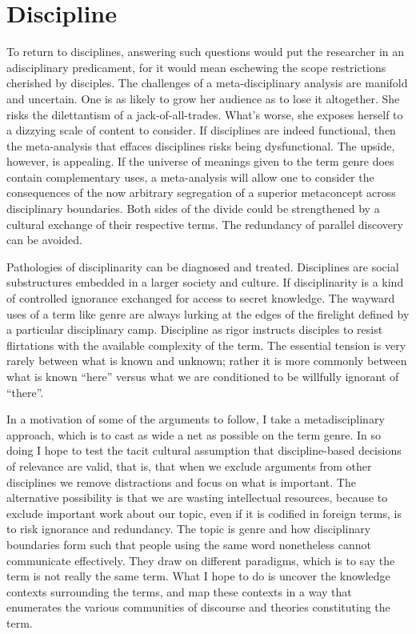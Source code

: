 \documentclass[]{book}
\theoremstyle{definition}
\theoremstyle{definition}
\theoremstyle{definition}
\theoremstyle{remark}
\begin{document}
\hypertarget{discipline}{%
\section{Discipline}\label{discipline}}

To return to disciplines, answering such questions would put the
researcher in an adisciplinary predicament, for it would mean eschewing
the scope restrictions cherished by disciples. The challenges of a
meta-disciplinary analysis are manifold and uncertain. One is as likely
to grow her audience as to lose it altogether. She risks the
dilettantism of a jack-of-all-trades. What's worse, she exposes herself
to a dizzying scale of content to consider. If disciplines are indeed
functional, then the meta-analysis that effaces disciplines risks being
dysfunctional. The upside, however, is appealing. If the universe of
meanings given to the term genre does contain complementary uses, a
meta-analysis will allow one to consider the consequences of the now
arbitrary segregation of a superior metaconcept across disciplinary
boundaries. Both sides of the divide could be strengthened by a cultural
exchange of their respective terms. The redundancy of parallel discovery
can be avoided.

Pathologies of disciplinarity can be diagnosed and treated. Disciplines
are social substructures embedded in a larger society and culture. If
disciplinarity is a kind of controlled ignorance exchanged for access to
secret knowledge. The wayward uses of a term like genre are always
lurking at the edges of the firelight defined by a particular
disciplinary camp. Discipline as rigor instructs disciples to resist
flirtations with the available complexity of the term. The essential
tension is very rarely between what is known and unknown; rather it is
more commonly between what is known ``here'' versus what we are
conditioned to be willfully ignorant of ``there''.

In a motivation of some of the arguments to follow, I take a
metadisciplinary approach, which is to cast as wide a net as possible on
the term genre. In so doing I hope to test the tacit cultural assumption
that discipline-based decisions of relevance are valid, that is, that
when we exclude arguments from other disciplines we remove distractions
and focus on what is important. The alternative possibility is that we
are wasting intellectual resources, because to exclude important work
about our topic, even if it is codified in foreign terms, is to risk
ignorance and redundancy. The topic is genre and how disciplinary
boundaries form such that people using the same word nonetheless cannot
communicate effectively. They draw on different paradigms, which is to
say the term is not really the same term. What I hope to do is uncover
the knowledge contexts surrounding the terms, and map these contexts in
a way that enumerates the various communities of discourse and theories
constituting the term.
\end{document}
